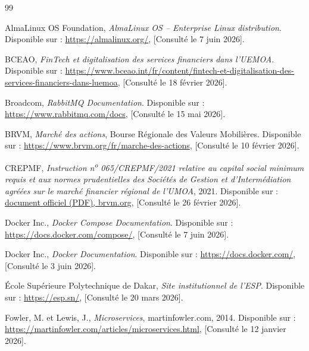 \renewcommand{\bibname}{Références bibliographiques}
\begin{thebibliography}{99}
{}

AlmaLinux OS Foundation, \textit{AlmaLinux OS -- Enterprise Linux distribution}.
Disponible sur : \url{https://almalinux.org/}, [Consulté le 7 juin 2026].

BCEAO, \textit{FinTech et digitalisation des services financiers dans l'UEMOA}.
Disponible sur : \url{https://www.bceao.int/fr/content/fintech-et-digitalisation-des-services-financiers-dans-luemoa}, [Consulté le 18 février 2026].

Broadcom, \textit{RabbitMQ Documentation}.
Disponible sur : \url{https://www.rabbitmq.com/docs}, [Consulté le 15 mai 2026].

BRVM, \textit{Marché des actions}, Bourse Régionale des Valeurs Mobilières.
Disponible sur : \url{https://www.brvm.org/fr/marche-des-actions}, [Consulté le 10 février 2026].

CREPMF, \textit{Instruction n\textsuperscript{o} 065/CREPMF/2021 relative au
capital social minimum requis et aux normes prudentielles des Sociétés de
Gestion et d'Intermédiation agréées sur le marché financier régional de
l'UMOA}, 2021. Disponible sur :
\href{https://www.brvm.org/sites/default/files/20230801_-_instruction_ndeg065-crepmf-2021_-_capital_social_minimum_requis_et_aux_normes_prudentielles_des_sgi_agreees_sur_le_mfr_de_lumoa_0.pdf}{document officiel (PDF), brvm.org}, [Consulté le 26 février 2026].

Docker Inc., \textit{Docker Compose Documentation}.
Disponible sur : \url{https://docs.docker.com/compose/}, [Consulté le 7 juin 2026].

Docker Inc., \textit{Docker Documentation}.
Disponible sur : \url{https://docs.docker.com/}, [Consulté le 3 juin 2026].

École Supérieure Polytechnique de Dakar, \textit{Site institutionnel de l'ESP}.
Disponible sur : \url{https://esp.sn/}, [Consulté le 20 mars 2026].

Fowler, M. et Lewis, J., \textit{Microservices}, martinfowler.com, 2014.
Disponible sur : \url{https://martinfowler.com/articles/microservices.html}, [Consulté le 12 janvier 2026].


\end{thebibliography}
